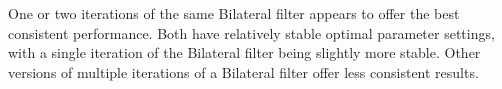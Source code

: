 \documentclass[11pt]{article}
\theoremstyle{definition}
\begin{document}
One or two iterations of the same Bilateral filter appears to offer the best consistent performance. Both have relatively stable optimal parameter settings, with a single iteration of the Bilateral filter being slightly more stable. Other versions of multiple iterations of a Bilateral filter offer less consistent results.


\FloatBarrier

%


\end{document}
